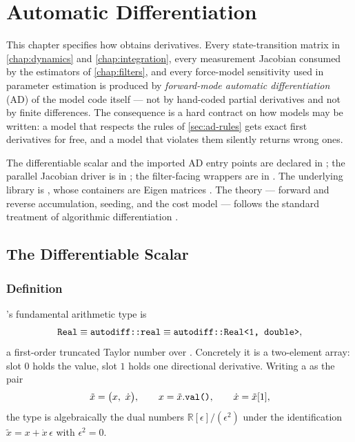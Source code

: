 \chapter{Automatic Differentiation}
\label{chap:autodiff}

This chapter specifies how \lupnt{} obtains derivatives. Every
state-transition matrix in \cref{chap:dynamics} and \cref{chap:integration},
every measurement Jacobian consumed by the estimators of \cref{chap:filters},
and every force-model sensitivity used in parameter estimation is produced by
\emph{forward-mode automatic differentiation} (AD) of the model code itself
--- not by hand-coded partial derivatives and not by finite differences. The
consequence is a hard contract on how models may be written: a model that
respects the rules of \cref{sec:ad-rules} gets exact first derivatives for
free, and a model that violates them silently returns wrong ones.

The differentiable scalar and the imported AD entry points are declared in
; the parallel Jacobian driver is in
; the filter-facing wrappers are in
. The underlying library is
 \citep{leal2018autodiff}, whose containers are Eigen matrices
\citep{eigen2010}. The theory --- forward and reverse accumulation, seeding,
and the cost model --- follows the standard treatment of algorithmic
differentiation \citep{griewank2008}.

\section{The Differentiable Scalar \texorpdfstring{}{Real}}
\label{sec:ad-real}

\subsection{Definition}

\lupnt{}'s fundamental arithmetic type is
\begin{equation}
  \label{eq:ad-real}
  \texttt{Real} \equiv \texttt{autodiff::real} \equiv \texttt{autodiff::Real<1, double>},
\end{equation}
a first-order truncated Taylor number over . Concretely it is a
two-element array: slot $0$ holds the value, slot $1$ holds one directional
derivative. Writing a  as the pair
\begin{equation}
  \label{eq:ad-dual}
  \tilde{x} = \big(x,\ \dot{x}\big),
  \qquad x = \tilde{x}.\texttt{val()},
  \qquad \dot{x} = \tilde{x}[1],
\end{equation}
the type is algebraically the dual numbers $\mathbb{R}[\epsilon]/(\epsilon^2)$
under the identification $\tilde{x} = x + \dot{x}\,\epsilon$ with
$\epsilon^2 = 0$.

